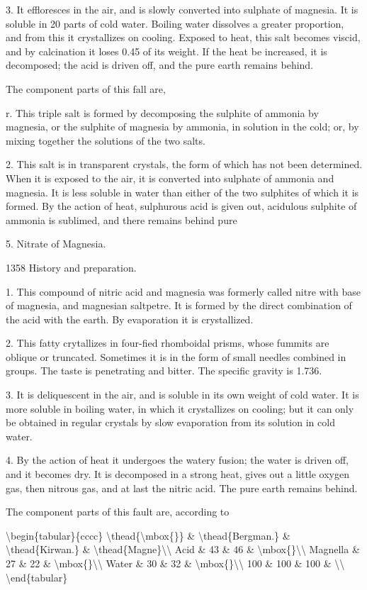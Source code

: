 \documentclass{article}
\begin{document}
3. It effloresces in the air, and is slowly converted into sulphate of magnesia. It is soluble in 20 parts of cold water. Boiling water dissolves a greater proportion, and from this it crystallizes on cooling. Exposed to heat, this salt becomes viscid, and by calcination it loses 0.45 of its weight. If the heat be increased, it is decomposed; the acid is driven off, and the pure earth remains behind.

The component parts of this fall are,

r. This triple salt is formed by decomposing the sulphite of ammonia by magnesia, or the sulphite of magnesia by ammonia, in solution in the cold; or, by mixing together the solutions of the two salts.

2. This salt is in transparent crystals, the form of which has not been determined. When it is exposed to the air, it is converted into sulphate of ammonia and magnesia. It is less soluble in water than either of the two sulphites of which it is formed. By the action of heat, sulphurous acid is given out, acidulous sulphite of ammonia is sublimed, and there remains behind pure

5. Nitrate of Magnesia.

1358
History and preparation.

1. This compound of nitric acid and magnesia was formerly called nitre with base of magnesia, and magnesian saltpetre. It is formed by the direct combination of the acid with the earth. By evaporation it is crystallized.

2. This fatty crytallizes in four-fied rhomboidal prisms, whose fummits are oblique or truncated. Sometimes it is in the form of small needles combined in groups. The taste is penetrating and bitter. The specific gravity is 1.736.

3. It is deliquescent in the air, and is soluble in its own weight of cold water. It is more soluble in boiling water, in which it crystallizes on cooling; but it can only be obtained in regular crystals by slow evaporation from its solution in cold water.

4. By the action of heat it undergoes the watery fusion; the water is driven off, and it becomes dry. It is decomposed in a strong heat, gives out a little oxygen gas, then nitrous gas, and at last the nitric acid. The pure earth remains behind.

The component parts of this fault are, according to

\textbackslash{}begin\{tabular\}\{cccc\}
\textbackslash{}thead\{\textbackslash{}mbox\{\}\} \& \textbackslash{}thead\{Bergman.\} \& \textbackslash{}thead\{Kirwan.\} \& \textbackslash{}thead\{Magne\}\textbackslash{}\textbackslash{}
Acid \& 43 \& 46 \& \textbackslash{}mbox\{\}\textbackslash{}\textbackslash{}
Magnella \& 27 \& 22 \& \textbackslash{}mbox\{\}\textbackslash{}\textbackslash{}
Water \& 30 \& 32 \& \textbackslash{}mbox\{\}\textbackslash{}\textbackslash{}
100 \& 100 \& 100 \& \textbackslash{}\textbackslash{}
\textbackslash{}end\{tabular\}
\end{document}

